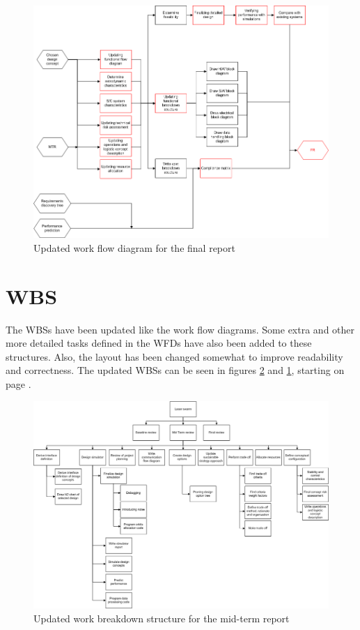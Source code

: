 \begin{figure}
\centering
\includegraphics[width=\textheight, angle=90]{chapters/img/Workflow_diagram_FR_v2.png}
\caption{Updated work flow diagram for the final report}
\label{fig:WFfinal2}
\end{figure}


\section{\acl{WBS}}
\label{WBS}
The \acp{WBS} have been updated like the work flow diagrams. Some extra and other more detailed tasks
defined in the \acp{WFD} have also been added to these structures. Also, the layout has been changed somewhat to improve readability and correctness. The updated \acp{WBS} can be seen in figures \ref{fig:WBmidterm2} and \ref{fig:WFfinal2}, starting on page \pageref{fig:WBmidterm2}.

\begin{figure}
\centering
\includegraphics[width=\textheight, angle=90]{chapters/img/Workbreakdown_structure_MTR_v2.png}
\caption{Updated work breakdown structure for the mid-term report}
\label{fig:WBmidterm2}
\end{figure}

